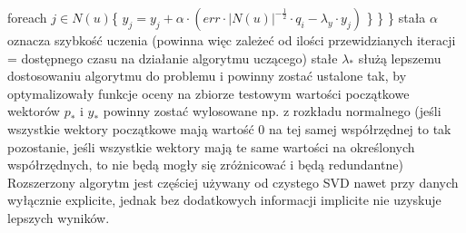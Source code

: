 \documentclass{pracamgr}
\begin{document}
    \hspace*{48pt}			foreach $j\in N(u)$\{\newline
    \hspace*{64pt}				$y_j=y_j+\alpha\cdot(err\cdot |N(u)|^{-\frac{1}{2}}\cdot q_i-\lambda_y\cdot y_j)$\newline
    \hspace*{48pt}			\}\newline
    \hspace*{32pt}		\}\newline
    \hspace*{16pt}	\}\newline
     {\scriptsize
      stała $\alpha$ oznacza szybkość uczenia (powinna więc zależeć od ilości przewidzianych iteracji = dostępnego czasu na działanie algorytmu uczącego)\newline
      stałe $\lambda_*$ służą lepszemu dostosowaniu algorytmu do problemu i powinny zostać ustalone tak, by optymalizowały funkcje oceny na zbiorze testowym\newline
      wartości początkowe wektorów $p_*$ i $y_*$ powinny zostać wylosowane np. z rozkładu normalnego
      (jeśli wszystkie wektory początkowe mają wartość $0$ na tej samej współrzędnej to tak pozostanie,
      jeśli wszystkie wektory mają te same wartości na określonych współrzędnych, to nie będą mogły się zróżnicować i będą redundantne)
     }\newline
     Rozszerzony algorytm jest częściej używany od czystego SVD nawet przy danych wyłącznie explicite,
     jednak bez dodatkowych informacji implicite nie uzyskuje lepszych wyników.
\end{document}
